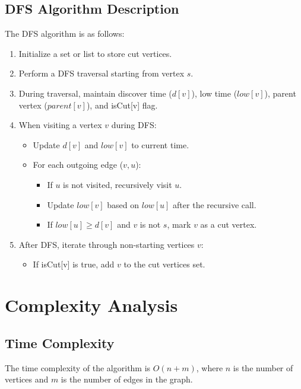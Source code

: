\documentclass{article}
\begin{document}
        \subsection{DFS Algorithm Description}
        The DFS algorithm is as follows:
        \begin{enumerate}
            \item Initialize a set or list to store cut vertices.
            \item Perform a DFS traversal starting from vertex $s$.
            \item During traversal, maintain discover time ($d[v]$), low time ($low[v]$), parent vertex ($parent[v]$), and isCut[v] flag.
            \item When visiting a vertex $v$ during DFS:
            \begin{itemize}
                \item Update $d[v]$ and $low[v]$ to current time.
                \item For each outgoing edge ($v, u$):
                \begin{itemize}
                    \item If $u$ is not visited, recursively visit $u$.
                    \item Update $low[v]$ based on $low[u]$ after the recursive call.
                    \item If $low[u] \geq d[v]$ and $v$ is not $s$, mark $v$ as a cut vertex.
                \end{itemize}
            \end{itemize}
            \item After DFS, iterate through non-starting vertices $v$:
            \begin{itemize}
                \item If isCut[v] is true, add $v$ to the cut vertices set.
            \end{itemize}
        \end{enumerate}

\section{Complexity Analysis}
    \subsection{Time Complexity}
        The time complexity of the algorithm is $O(n + m)$, where $n$ is the number of vertices and $m$ is the number of edges in the graph.
\end{document}
